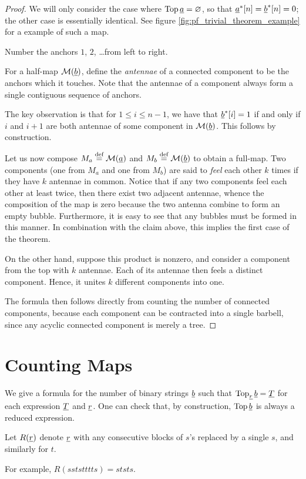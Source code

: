\begin{proof}
	We will only consider the case where $\operatorname{Top} \underline{a} = \varnothing$, so that $\underline{a}^\ast[n] = \underline{b}^\ast[n] = 0$; the other case is essentially identical.  See figure \ref{fig:pf_trivial_theorem_example} for a example of such a map.

	Number the anchors $1$, $2$, \dots from left to right.

	For a half-map $\mathcal M(\underline{b})$, define the \emph{antennae} of a connected component to be the anchors which it touches.  Note that the antennae of a component always form a single contiguous sequence of anchors.

	The key observation is that for $1 \le i \le n-1$, we have that $\underline{b}^\ast[i] = 1$ if and only if $i$ and $i+1$ are both antennae of some component in $\mathcal M(\underline{b})$.  This follows by construction.

	Let us now compose $M_a \stackrel{\text{def}}{=} \mathcal M(\underline{a})$ and $M_b \stackrel{\text{def}}{=} \mathcal M(\underline{b})$ to obtain a full-map.  Two components (one from $M_a$ and one from $M_b$) are said to \emph{feel} each other $k$ times if they have $k$ antennae in common.  Notice that if any two components feel each other at least twice, then there exist two adjacent antennae, whence the composition of the map is zero because the two antenna combine to form an empty bubble.  Furthermore, it is easy to see that any bubbles must be formed in this manner.  In combination with the claim above, this implies the first case of the theorem.

	On the other hand, suppose this product is nonzero, and consider a component from the top with $k$ antennae.  Each of its antennae then feels a distinct component.  Hence, it unites $k$ different components into one.

	The formula then follows directly from counting the number of connected components, because each component can be contracted into a single barbell, since any acyclic connected component is merely a tree.
\end{proof}

\section{Counting Maps}
We give a formula for the number of binary strings $\underline{b}$ such that $\operatorname{Top}_{\underline{r}} \underline{b} = \underline{T}$ for each expression $\underline{T}$ and $\underline{r}$.  One can check that, by construction, $\operatorname{Top} \underline{b}$ is always a reduced expression.

\begin{definition*}
	Let $R(\underline{r})$ denote $\underline{r}$ with any consecutive blocks of $s$'s replaced by a single $s$, and similarly for $t$.
\end{definition*}
For example, $R(sststttts) = ststs$.

